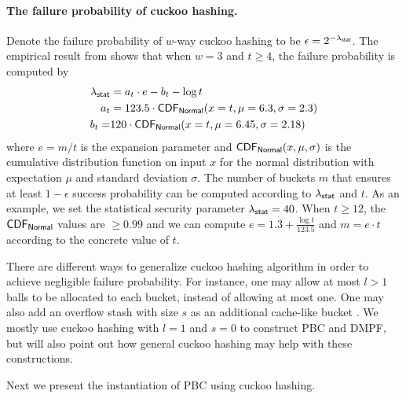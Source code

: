 \paragraph{The failure probability of cuckoo hashing.}Denote the failure probability of $w$-way cuckoo hashing to be $\epsilon=2^{-\lambda_{{\sf stat}}}$. The empirical result from \cite[Appendix B]{cryptoeprint:2018/579} shows that when $w=3$ and $t\ge 4$, the failure probability is computed by 
\[\begin{split}
  \lambda_{\sf stat} &= a_t\cdot e - b_t-\log t\\
  a_t &= 123.5\cdot {\sf CDF_{Normal}}(x=t, \mu = 6.3, \sigma = 2.3)\\
  b_t =& 120\cdot {\sf CDF_{Normal}}(x=t, \mu = 6.45, \sigma = 2.18)
\end{split}
\] where $e = m/t$ is the expansion parameter and ${\sf CDF_{Normal}}(x,\mu,\sigma)$ is the cumulative distribution function on input $x$ for the normal distribution with expectation $\mu$ and standard deviation $\sigma$. The number of buckets $m$ that ensures at least $1-\epsilon$ success probability can be computed according to $\lambda_{\sf stat}$ and $t$. As an example, we set the statistical security parameter $\lambda_{{\sf stat}}=40$. When $t\ge 12$, the $\sf CDF_{Normal}$ values are $\ge 0.99$ and we can compute $e = 1.3+\frac{\log t}{123.5}$ and $m = e\cdot t$ according to the concrete value of $t$. 

\begin{remark}
    There are different ways to generalize cuckoo hashing algorithm in order to achieve negligible failure probability. For instance, one may allow at most $l>1$ balls to be allocated to each bucket, instead of allowing at most one. One may also add an overflow stash with size $s$ as an additional cache-like bucket \cite{KMW10}. We mostly use cuckoo hashing with $l=1$ and $s=0$ to construct PBC and DMPF, but will also point out how general cuckoo hashing may help with these constructions.
\end{remark}

Next we present the instantiation of PBC using cuckoo hashing. 



